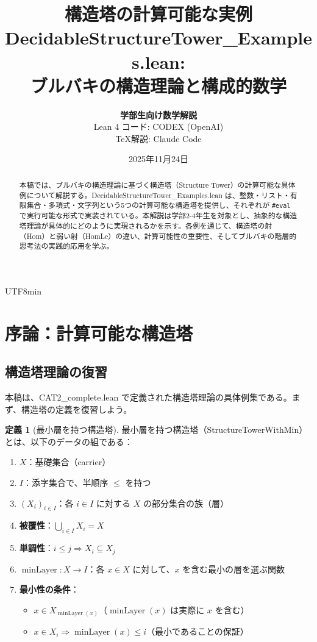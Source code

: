 \documentclass[12pt,a4paper]{article}
\title{\textbf{構造塔の計算可能な実例} \\
\large DecidableStructureTower\_Examples.lean: \\
ブルバキの構造理論と構成的数学}
\author{
  \textbf{学部生向け数学解説} \\[0.5em]
  \small Lean 4 コード: CODEX (OpenAI) \\
  \small \TeX 解説: Claude Code
}
\date{2025年11月24日}
\theoremstyle{definition}
\newtheorem{definition}[theorem]{定義}
\theoremstyle{remark}
\DeclareMathOperator{\minLayer}{minLayer}
\begin{document}
\begin{CJK}{UTF8}{min}

\maketitle

\begin{abstract}
本稿では、ブルバキの構造理論に基づく構造塔（Structure Tower）の計算可能な具体例について解説する。DecidableStructureTower\_Examples.lean は、整数・リスト・有限集合・多項式・文字列という5つの計算可能な構造塔を提供し、それぞれが \texttt{\#eval} で実行可能な形式で実装されている。本解説は学部2-4年生を対象とし、抽象的な構造塔理論が具体的にどのように実現されるかを示す。各例を通じて、構造塔の射（Hom）と弱い射（HomLe）の違い、計算可能性の重要性、そしてブルバキの階層的思考法の実践的応用を学ぶ。
\end{abstract}

\tableofcontents
\clearpage

\section{序論：計算可能な構造塔}

\subsection{構造塔理論の復習}

本稿は、CAT2\_complete.lean で定義された構造塔理論の具体例集である。まず、構造塔の定義を復習しよう。

\begin{definition}[最小層を持つ構造塔]
最小層を持つ構造塔（StructureTowerWithMin）とは、以下のデータの組である：
\begin{enumerate}
\item $X$：基礎集合（carrier）
\item $I$：添字集合で、半順序 $\leq$ を持つ
\item $(X_i)_{i \in I}$：各 $i \in I$ に対する $X$ の部分集合の族（層）
\item \textbf{被覆性}：$\bigcup_{i \in I} X_i = X$
\item \textbf{単調性}：$i \leq j \Rightarrow X_i \subseteq X_j$
\item $\minLayer : X \to I$：各 $x \in X$ に対して、$x$ を含む最小の層を選ぶ関数
\item \textbf{最小性の条件}：
  \begin{itemize}
  \item $x \in X_{\minLayer(x)}$（$\minLayer(x)$ は実際に $x$ を含む）
  \item $x \in X_i \Rightarrow \minLayer(x) \leq i$（最小であることの保証）
  \end{itemize}
\end{enumerate}
\end{definition}


\end{CJK}
\end{document}
